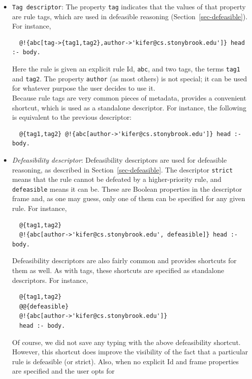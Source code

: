 \documentclass[11pt]{article}
\newcommand{\ERGO}{\mbox{\smaller{\ensuremath{\cal{E}}\smaller{{\sc{RGO}}}}}\xspace}
\newcommand{\FLSYSTEM}{\ERGO}
\begin{document}
\begin{itemize}
\item \texttt{Tag descriptor}:
  The property \texttt{tag} indicates that the values of that property are
  rule tags, which are used in defeasible reasoning
  (Section~\ref{sec-defeasible}). For instance,
\begin{verbatim}
  @!{abc[tag->{tag1,tag2},author->'kifer@cs.stonybrook.edu']} head :- body.  
\end{verbatim}
  Here the rule is given an explicit rule Id, \texttt{abc}, and
  two tags, the terms \texttt{tag1} and
  \texttt{tag2}. The
  property \texttt{author} (as most others) is not special; it can be used
  for whatever purpose the user decides to use it.
  \\
  Because rule tags are very common pieces of metadata, \FLSYSTEM provides a
  convenient shortcut, which is used as a standalone descriptor. For
  instance, the following is equivalent to the previous descriptor:
\begin{verbatim}
  @{tag1,tag2} @!{abc[author->'kifer@cs.stonybrook.edu']} head :- body.
\end{verbatim}
\item \emph{Defeasibility descriptor}:
  Defeasibility descriptors are used for defeasible
  reasoning, as described in Section~\ref{sec-defeasible}. The descriptor
  \texttt{strict} means that the rule cannot be defeated by a
  higher-priority rule, and \texttt{defeasible} means it can be. These are
  Boolean properties in the descriptor frame and, as one may guess, only
  one of them can be specified for any given rule. For instance,
\begin{verbatim}
  @{tag1,tag2}
  @!{abc[author->'kifer@cs.stonybrook.edu', defeasible]} head :- body.
\end{verbatim}
  Defeasibility descriptors are also fairly common and \FLSYSTEM provides shortcuts for
  them as well. As with tags, these shortcuts are specified as standalone
  descriptors. For instance,
\begin{verbatim}
  @{tag1,tag2}
  @@{defeasible}
  @!{abc[author->'kifer@cs.stonybrook.edu']}
  head :- body.
\end{verbatim}
  Of course, we did not save any typing with the above defeasibility
  shortcut. However, this shortcut does improve the visibility of
  the fact that a particular rule is defeasible (or strict). Also, when no
  explicit Id and frame properties are specified and the user opts for

\end{itemize}
\end{document}
